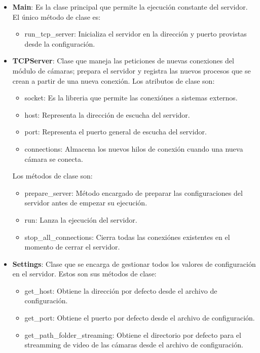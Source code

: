 \begin{itemize}
    \item \textbf{Main}: Es la clase principal que permite la ejecución constante del servidor. El único método de clase es:
        \begin{itemize}
            \item run\_tcp\_server: Inicializa el servidor en la dirección y puerto provistas desde la configuración.
        \end{itemize}
    \item \textbf{TCPServer}: Clase que maneja las peticiones de nuevas conexiones del módulo de cámaras; prepara el servidor y registra las nuevos procesos que se crean a partir de una nueva conexión. Los atributos de clase son:
        \begin{itemize}
            \item socket: Es la libreria que permite las conexiónes a sistemas externos.
            \item host: Representa la dirección de escucha del servidor.
            \item port: Representa el puerto general de escucha del servidor.
            \item connections: Almacena los nuevos hilos de conexión cuando una nueva cámara se conecta.
        \end{itemize}
        Los métodos de clase son:
        \begin{itemize}
            \item prepare\_server: Método encargado de preparar las configuraciones del servidor antes de empezar su ejecución.
            \item run: Lanza la ejecución del servidor.
            \item stop\_all\_connections: Cierra todas las conexiónes existentes en el momento de cerrar el servidor.
        \end{itemize}
    \item \textbf{Settings}: Clase que se encarga de gestionar todos los valores de configuración en el servidor. Estos son sus métodos de clase:
        \begin{itemize}
            \item get\_host: Obtiene la dirección por defecto desde el archivo de configuración.
            \item get\_port: Obtiene el puerto por defecto desde el archivo de configuración.
            \item get\_path\_folder\_streaming: Obtiene el directorio por defecto para el streamming de video de las cámaras desde el archivo de configuración.

\end{itemize}
\end{itemize}
